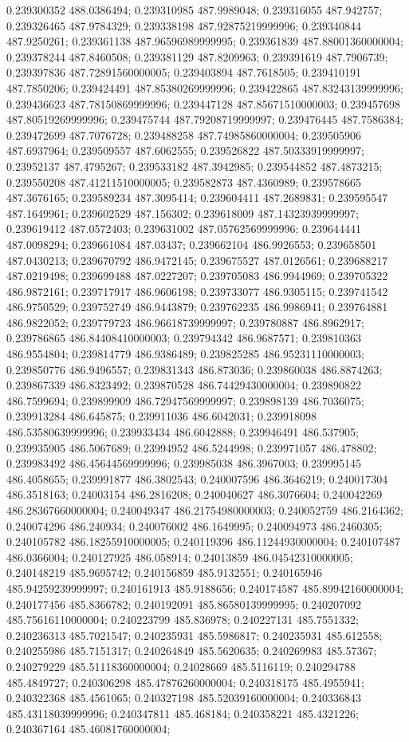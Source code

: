 0.239300352 488.0386494; 0.239310985 487.9989048; 0.239316055 487.942757; 0.239326465 487.9784329; 0.239338198 487.92875219999996; 0.239340844 487.9250261; 0.239361138 487.96596989999995; 0.239361839 487.88001360000004; 0.239378244 487.8460508; 0.239381129 487.8209963; 0.239391619 487.7906739; 0.239397836 487.72891560000005; 0.239403894 487.7618505; 0.239410191 487.7850206; 0.239424491 487.85380269999996; 0.239422865 487.83243139999996; 0.239436623 487.78150869999996; 0.239447128 487.85671510000003; 0.239457698 487.80519269999996; 0.239475744 487.79208719999997; 0.239476445 487.7586384; 0.239472699 487.7076728; 0.239488258 487.74985860000004; 0.239505906 487.6937964; 0.239509557 487.6062555; 0.239526822 487.50333919999997; 0.23952137 487.4795267; 0.239533182 487.3942985; 0.239544852 487.4873215; 0.239550208 487.41211510000005; 0.239582873 487.4360989; 0.239578665 487.3676165; 0.239589234 487.3095414; 0.239604411 487.2689831; 0.239595547 487.1649961; 0.239602529 487.156302; 0.239618009 487.14323939999997; 0.239619412 487.0572403; 0.239631002 487.05762569999996; 0.239644441 487.0098294; 0.239661084 487.03437; 0.239662104 486.9926553; 0.239658501 487.0430213; 0.239670792 486.9472145; 0.239675527 487.0126561; 0.239688217 487.0219498; 0.239699488 487.0227207; 0.239705083 486.9944969; 0.239705322 486.9872161; 0.239717917 486.9606198; 0.239733077 486.9305115; 0.239741542 486.9750529; 0.239752749 486.9443879; 0.239762235 486.9986941; 0.239764881 486.9822052; 0.239779723 486.96618739999997; 0.239780887 486.8962917; 0.239786865 486.84408410000003; 0.239794342 486.9687571; 0.239810363 486.9554804; 0.239814779 486.9386489; 0.239825285 486.95231110000003; 0.239850776 486.9496557; 0.239831343 486.873036; 0.239860038 486.8874263; 0.239867339 486.8323492; 0.239870528 486.74429430000004; 0.239890822 486.7599694; 0.239899909 486.72947569999997; 0.239898139 486.7036075; 0.239913284 486.645875; 0.239911036 486.6042031; 0.239918098 486.53580639999996; 0.239933434 486.6042888; 0.239946491 486.537905; 0.239935905 486.5067689; 0.23994952 486.5244998; 0.239971057 486.478802; 0.239983492 486.45644569999996; 0.239985038 486.3967003; 0.239995145 486.4058655; 0.239991877 486.3802543; 0.240007596 486.3646219; 0.240017304 486.3518163; 0.24003154 486.2816208; 0.240040627 486.3076604; 0.240042269 486.28367660000004; 0.240049347 486.21754980000003; 0.240052759 486.2164362; 0.240074296 486.240934; 0.240076002 486.1649995; 0.240094973 486.2460305; 0.240105782 486.18255910000005; 0.240119396 486.11244930000004; 0.240107487 486.0366004; 0.240127925 486.058914; 0.24013859 486.04542310000005; 0.240148219 485.9695742; 0.240156859 485.9132551; 0.240165946 485.94259239999997; 0.240161913 485.9188656; 0.240174587 485.89942160000004; 0.240177456 485.8366782; 0.240192091 485.86580139999995; 0.240207092 485.75616110000004; 0.240223799 485.836978; 0.240227131 485.7551332; 0.240236313 485.7021547; 0.240235931 485.5986817; 0.240235931 485.612558; 0.240255986 485.7151317; 0.240264849 485.5620635; 0.240269983 485.57367; 0.240279229 485.51118360000004; 0.24028669 485.5116119; 0.240294788 485.4849727; 0.240306298 485.47876260000004; 0.240318175 485.4955941; 0.240322368 485.4561065; 0.240327198 485.52039160000004; 0.240336843 485.43118039999996; 0.240347811 485.468184; 0.240358221 485.4321226; 0.240367164 485.46081760000004; 